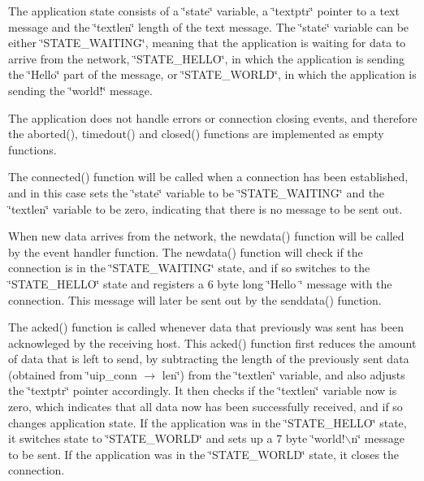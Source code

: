 The application state consists of a \char`\"{}state\char`\"{} variable, a \char`\"{}textptr\char`\"{} pointer to a text message and the \char`\"{}textlen\char`\"{} length of the text message. The \char`\"{}state\char`\"{} variable can be either \char`\"{}STATE\_\-WAITING\char`\"{}, meaning that the application is waiting for data to arrive from the network, \char`\"{}STATE\_\-HELLO\char`\"{}, in which the application is sending the \char`\"{}Hello\char`\"{} part of the message, or \char`\"{}STATE\_\-WORLD\char`\"{}, in which the application is sending the \char`\"{}world!\char`\"{} message.

The application does not handle errors or connection closing events, and therefore the aborted(), timedout() and closed() functions are implemented as empty functions.

The connected() function will be called when a connection has been established, and in this case sets the \char`\"{}state\char`\"{} variable to be \char`\"{}STATE\_\-WAITING\char`\"{} and the \char`\"{}textlen\char`\"{} variable to be zero, indicating that there is no message to be sent out.

When new data arrives from the network, the newdata() function will be called by the event handler function. The newdata() function will check if the connection is in the \char`\"{}STATE\_\-WAITING\char`\"{} state, and if so switches to the \char`\"{}STATE\_\-HELLO\char`\"{} state and registers a 6 byte long \char`\"{}Hello \char`\"{} message with the connection. This message will later be sent out by the senddata() function.

The acked() function is called whenever data that previously was sent has been acknowleged by the receiving host. This acked() function first reduces the amount of data that is left to send, by subtracting the length of the previously sent data (obtained from \char`\"{}uip\_\-conn $\rightarrow$ len\char`\"{}) from the \char`\"{}textlen\char`\"{} variable, and also adjusts the \char`\"{}textptr\char`\"{} pointer accordingly. It then checks if the \char`\"{}textlen\char`\"{} variable now is zero, which indicates that all data now has been successfully received, and if so changes application state. If the application was in the \char`\"{}STATE\_\-HELLO\char`\"{} state, it switches state to \char`\"{}STATE\_\-WORLD\char`\"{} and sets up a 7 byte \char`\"{}world!$\backslash$n\char`\"{} message to be sent. If the application was in the \char`\"{}STATE\_\-WORLD\char`\"{} state, it closes the connection.

